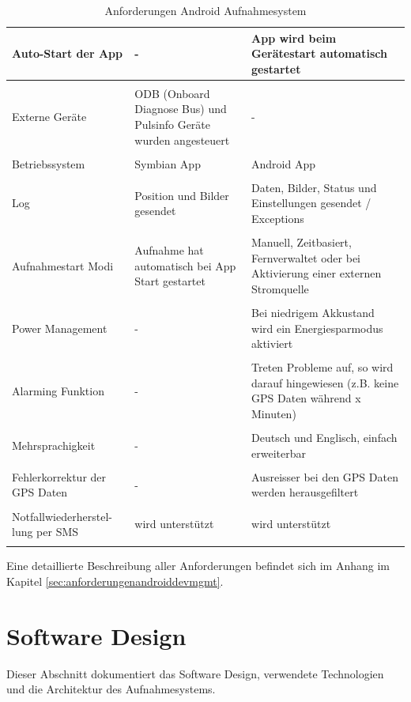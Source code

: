 \begin{longtable}{ >{\RaggedRight} p{3.5cm} | >{\RaggedRight}p{4.3cm} | >{\RaggedRight}p{4.3cm} }
	Auto-Start der App & - & App wird beim Ger\"{a}testart automatisch gestartet\\ [1ex] \hline & &  \\ [-1.5ex]
    Externe Ger\"{a}te & ODB (Onboard Diagnose Bus) und Pulsinfo Ger\"{a}te wurden angesteuert & -\\ [1ex] \hline & &  \\ [-1.5ex]
    Betriebssystem & Symbian App & Android App\\ [1ex] \hline & &  \\ [-1.5ex]
    Log & Position und Bilder gesendet & Daten, Bilder, Status und Einstellungen gesendet / Exceptions\\ [1ex] \hline & &  \\ [-1.5ex]
    Aufnahmestart Modi & Aufnahme hat automatisch bei App Start gestartet & Manuell, Zeitbasiert, Fernverwaltet oder bei Aktivierung einer externen Stromquelle\\ [1ex] \hline & &  \\ [-1.5ex]
   	Power Management & - & Bei niedrigem Akkustand wird ein Energiesparmodus aktiviert\\ [1ex] \hline & &  \\ [-1.5ex]
    Alarming Funktion & - & Treten Probleme auf, so wird darauf hingewiesen (z.B. keine GPS Daten w\"{a}hrend x Minuten)\\ [1ex] \hline & &  \\ [-1.5ex]
    Mehrsprachigkeit & - & Deutsch und Englisch, einfach erweiterbar\\ [1ex] \hline & &  \\ 
    [-1.5ex] Fehlerkorrektur der GPS Daten & - & Ausreisser bei den GPS Daten werden herausgefiltert\\ [1ex] \hline & &  \\ 
    [-1.5ex] Notfallwiederherstel- lung per SMS & wird unterstützt & wird unterstützt\\ [1ex]
    
\caption{Anforderungen Android Aufnahmesystem}
\end{longtable}

Eine detaillierte Beschreibung aller Anforderungen befindet sich im Anhang im Kapitel \ref{sec:anforderungenandroiddevmgmt}.

\section{Software Design}
Dieser Abschnitt dokumentiert das Software Design, verwendete Technologien und die Architektur des Aufnahmesystems.


